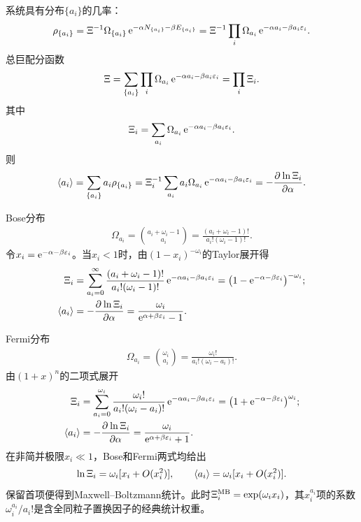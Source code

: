 系统具有分布$\{a_i\}$的几率：
\[
	\rho_{\{a_i\}} = \Xi^{-1}\Omega_{\{a_i\}}\mathop{}\!\mathrm{e}^{-\alpha N_{\{a_i\}}-\beta E_{\{a_i\}}} = \Xi^{-1}\prod_i\Omega_{a_i}\mathop{}\!\mathrm{e}^{-\alpha{a_i}-\beta{a_i\varepsilon_i}}.
\]
总巨配分函数
\[
	\Xi = \sum_{\{a_i\}}\prod_i\Omega_{a_i}\mathop{}\!\mathrm{e}^{-\alpha{a_i}-\beta{a_i\varepsilon_i}} = \prod_i\Xi_i.
\]
其中 
\[
	\Xi_i = \sum_{a_i}\Omega_{a_i}\mathop{}\!\mathrm{e}^{-\alpha{a_i}-\beta{a_i\varepsilon_i}}.
\]
则
\begin{align*}
	\langle a_i\rangle = \sum_{\{a_i\}}a_i\rho_{\{a_i\}} = \Xi_i^{-1}\sum_{a_i}a_i\Omega_{a_i}\mathop{}\!\mathrm{e}^{-\alpha{a_i}-\beta{a_i\varepsilon_i}} = -\frac{\partial^{}\ln\Xi_i}{\partial{\alpha}^{}}.
\end{align*}

Bose分布
\begin{align}
	\Omega_{a_i} = \binom{a_i + \omega_i - 1}{a_i} = \frac{(a_i + \omega_i - 1)!}{a_i!(\omega_i - 1)!}.
\end{align}
令$x_i = \mathop{}\!\mathrm{e}^{-\alpha-\beta\varepsilon_i}$。当$x_i < 1$时，由$(1 - x_i)^{-\omega_i}$的Taylor展开得
\begin{align}
	\Xi_i &= \sum_{a_i=0}^\infty\frac{(a_i + \omega_i - 1)!}{a_i!(\omega_i - 1)!}\mathop{}\!\mathrm{e}^{-\alpha a_i-\beta a_i\varepsilon_i} = \bigl(1 - \mathop{}\!\mathrm{e}^{-\alpha-\beta\varepsilon_i}\bigr)^{-\omega_i};\\
	\langle a_i\rangle &= -\frac{\partial^{}\ln\Xi_i}{\partial{\alpha}^{}} = \frac{\omega_i}{\mathop{}\!\mathrm{e}^{\alpha+\beta\varepsilon_i} - 1}.
\end{align}

Fermi分布
\begin{align}
	\Omega_{a_i} = \binom{\omega_i}{a_i} = \frac{\omega_i!}{a_i!(\omega_i - a_i)!}.
\end{align}
由$(1 + x)^n$的二项式展开
\begin{align}
	\Xi_i &= \sum_{a_i=0}^{\omega_i}\frac{\omega_i!}{a_i!(\omega_i - a_i)!}\mathop{}\!\mathrm{e}^{-\alpha a_i-\beta a_i\varepsilon_i} = \bigl(1 + \mathop{}\!\mathrm{e}^{-\alpha-\beta\varepsilon_i}\bigr)^{\omega_i};\\
	\langle a_i\rangle &= -\frac{\partial^{}\ln\Xi_i}{\partial{\alpha}^{}} = \frac{\omega_i}{\mathop{}\!\mathrm{e}^{\alpha+\beta\varepsilon_i} + 1}.
\end{align}
在非简并极限$x_i \ll 1$，Bose和Fermi两式均给出
\[
	\ln\Xi_i = \omega_i[x_i + O(x_i^2)],\qquad
	\langle a_i\rangle = \omega_i[x_i + O(x_i^2)].
\]
保留首项便得到Maxwell--Boltzmann统计。此时$\Xi_i^{\rm MB} = \exp(\omega_i x_i)$，其$x_i^{a_i}$项的系数$\omega_i^{a_i}/a_i!$是含全同粒子置换因子的经典统计权重。
